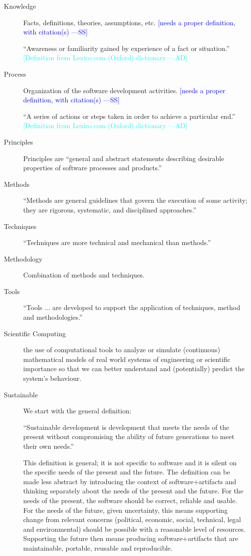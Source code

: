 \documentclass[12pt]{article}
\newcommand{\authornote}[3]{\textcolor{#1}{[#3 ---#2]}}
\newcommand{\authornote}[3]{}
\newcommand{\wss}[1]{\authornote{blue}{SS}{#1}} %
\newcommand{\ad}[1]{\authornote{cyan}{AD}{#1}} %
\begin{document}
\begin{description}
\item[Knowledge] Facts, definitions, theories, assumptions, etc. \wss{needs a
    proper definition, with citation(s)}

``Awareness or familiarity gained by experience of a fact or situation.'' \citep{OxfordKnowledge2020}
\ad{Definition from Lexico.com (Oxford) dictionary}

\item[Process] Organization of the software development activities.  \wss{needs a
    proper definition, with citation(s)}

``A series of actions or steps taken in order to achieve a particular end.''\citep{OxfordProcess2020}
\ad{Definition from Lexico.com (Oxford) dictionary}

\item[Principles] Principles are ``general and abstract statements describing
  desirable properties of software processes and products.''  \citep[p.\
  41]{GhezziEtAl2003}
\item[Methods] ``Methods are general guidelines that govern the execution of some activity;
  they are rigorous, systematic, and disciplined approaches.''  \citep[p.\
  41]{GhezziEtAl2003}
\item[Techniques] ``Techniques are more technical and mechanical than methods.''
  \cite[p.\ 41]{GhezziEtAl2003}
\item[Methodology] Combination of methods and techniques.  \citep[p.\
  41]{GhezziEtAl2003}
\item[Tools] ``Tools ... are developed to support the application of techniques,
  method and methodologies.'' \cite[p.\ 41]{GhezziEtAl2003}

\item[Scientific Computing] the use of computational tools to analyze or
  simulate (continuous) mathematical models of real world systems of engineering
  or scientific importance so that we can better understand and (potentially)
  predict the system's behaviour. \citep{SmithAndLai2005}
\item[Sustainable] We start with the general definition:

``Sustainable development is development that meets the needs
  of the present without compromising the ability of future generations to meet
  their own needs.'' \citep{Brundtland1987}

  This definition is general; it is not specific to software and it is silent on
  the specific needs of the present and the future.  The definition can be made
  less abstract by introducing the context of software+artifacts and thinking
  separately about the needs of the present and the future.  For the needs of
  the present, the software should be correct, reliable and usable. For the
  needs of the future, given uncertainty, this means supporting change from
  relevant concerns (political, economic, social, technical, legal and
  environmental) should be possible with a reasonable level of resources.
  Supporting the future then means producing software+artifacts that are
  maintainable, portable, reusable and reproducible.  


\end{description}
\end{document}
